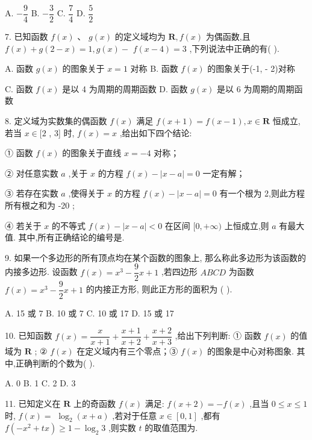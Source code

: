 A. $- \dfrac{9}{4}$ B. $- \dfrac{3}{2}$ C. $\dfrac{7}{4}$ D. $\dfrac{5}{2}$

7. 已知函数 $f\left( x\right) \text{ 、 }g\left( x\right)$ 的定义域均为 $\mathbf{R},f\left( x\right)$ 为偶函数,且 $f\left( x\right)  + g\left( {2 - x}\right)  = 1,g\left( x\right)  -$  $f\left( {x - 4}\right)  = 3$ ,下列说法中正确的有(   ).

A. 函数 $g\left( x\right)$ 的图象关于 $x = 1$ 对称 B. 函数 $f\left( x\right)$ 的图象关于(-1, - 2)对称

C. 函数 $f\left( x\right)$ 是以 4 为周期的周期函数 D. 函数 $g\left( x\right)$ 是以 6 为周期的周期函数

8. 定义域为实数集的偶函数 $f\left( x\right)$ 满足 $f\left( {x + 1}\right)  = f\left( {x - 1}\right) ,x \in  \mathbf{R}$ 恒成立,若当 $x \in  \lbrack 2$ , 3] 时, $f\left( x\right)  = x$ ,给出如下四个结论:

① 函数 $f\left( x\right)$ 的图象关于直线 $x =  - 4$ 对称；

② 对任意实数 $a$ ,关于 $x$ 的方程 $f\left( x\right)  - \left| {x - a}\right|  = 0$ 一定有解；

③ 若存在实数 $a$ ,使得关于 $x$ 的方程 $f\left( x\right)  - \left| {x - a}\right|  = 0$ 有一个根为 2,则此方程所有根之和为 -20 ;

④ 若关于 $x$ 的不等式 $f\left( x\right)  - \left| {x - a}\right|  < 0$ 在区间 $\lbrack 0, + \infty )$ 上恒成立,则 $a$ 有最大值. 其中,所有正确结论的编号是\blkda{}.

9. 如果一个多边形的所有顶点均在某个函数的图象上, 那么称此多边形为该函数的内接多边形. 设函数 $f\left( x\right)  = {x}^{3} - \dfrac{9}{2}x + 1$ ,若四边形 ${ABCD}$ 为函数 $f\left( x\right)  = {x}^{3} - \dfrac{9}{2}x + 1$ 的内接正方形, 则此正方形的面积为 (   ).

A. 15 或 7 B. 10 或 7 C. 10 或 17 D. 15 或 17

10. 已知函数 $f\left( x\right)  = \dfrac{x}{x + 1} + \dfrac{x + 1}{x + 2} + \dfrac{x + 2}{x + 3}$ ,给出下列判断: ① 函数 $f\left( x\right)$ 的值域为 $\mathbf{R}$ ; ② $f\left( x\right)$ 在定义域内有三个零点；③ $f\left( x\right)$ 的图象是中心对称图象. 其中,正确判断的个数为(   ).

A. 0 B. 1 C. 2 D. 3

11. 已知定义在 $\mathbf{R}$ 上的奇函数 $f\left( x\right)$ 满足: $f\left( {x + 2}\right)  =  - f\left( x\right)$ ,且当 $0 \leq  x \leq  1$ 时, $f\left( x\right)  =$  ${\log }_{2}\left( {x + a}\right)$ ,若对于任意 $x \in  \left\lbrack  {0,1}\right\rbrack$ ,都有 $f\left( {-{x}^{2} + {tx}}\right)  \geq  1 - {\log }_{2}3$ ,则实数 $t$ 的取值范围为\blkda{}.


